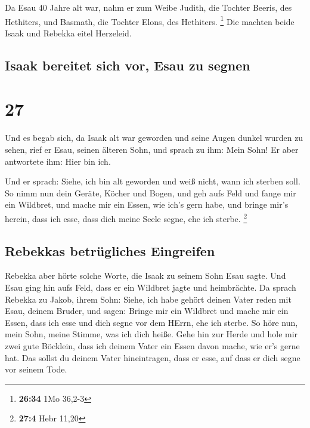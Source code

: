  Da Esau 40 Jahre alt war, nahm er zum Weibe Judith, die
Tochter Beeris, des Hethiters, und Basmath, die Tochter Elons, des
Hethiters. \footnote{\textbf{26:34} 1Mo 36,2-3}  Die
machten beide Isaak und Rebekka eitel Herzeleid.

\hypertarget{isaak-bereitet-sich-vor-esau-zu-segnen}{%
\subsection{Isaak bereitet sich vor, Esau zu
segnen}\label{isaak-bereitet-sich-vor-esau-zu-segnen}}

\hypertarget{section-26}{%
\section{27}\label{section-26}}

 Und es begab sich, da Isaak alt war geworden und seine
Augen dunkel wurden zu sehen, rief er Esau, seinen älteren Sohn, und
sprach zu ihm: Mein Sohn! Er aber antwortete ihm: Hier bin ich.

 Und er sprach: Siehe, ich bin alt geworden und weiß
nicht, wann ich sterben soll.  So nimm nun dein Geräte,
Köcher und Bogen, und geh aufs Feld und fange mir ein Wildbret,
 und mache mir ein Essen, wie ich's gern habe, und bringe
mir's herein, dass ich esse, dass dich meine Seele segne, ehe ich
sterbe. \footnote{\textbf{27:4} Hebr 11,20}

\hypertarget{rebekkas-betruxfcgliches-eingreifen}{%
\subsection{Rebekkas betrügliches
Eingreifen}\label{rebekkas-betruxfcgliches-eingreifen}}

 Rebekka aber hörte solche Worte, die Isaak zu seinem Sohn
Esau sagte. Und Esau ging hin aufs Feld, dass er ein Wildbret jagte und
heimbrächte.  Da sprach Rebekka zu Jakob, ihrem Sohn:
Siehe, ich habe gehört deinen Vater reden mit Esau, deinem Bruder, und
sagen:  Bringe mir ein Wildbret und mache mir ein Essen,
dass ich esse und dich segne vor dem HErrn, ehe ich sterbe.
 So höre nun, mein Sohn, meine Stimme, was ich dich heiße.
 Gehe hin zur Herde und hole mir zwei gute Böcklein, dass
ich deinem Vater ein Essen davon mache, wie er's gerne hat.
 Das sollst du deinem Vater hineintragen, dass er esse,
auf dass er dich segne vor seinem Tode.

